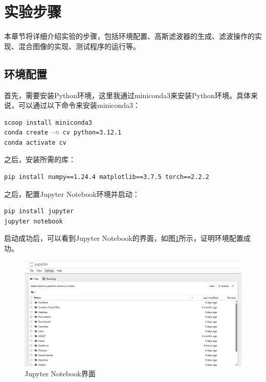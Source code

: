 \documentclass{article}
\begin{document}
\section{实验步骤}

本章节将详细介绍实验的步骤，包括环境配置、高斯滤波器的生成、滤波操作的实现、混合图像的实现、测试程序的运行等。

\subsection{环境配置}

首先，需要安装Python环境，这里我通过miniconda3来安装Python环境。具体来说，可以通过以下命令来安装miniconda3：

\begin{lstlisting}[language=bash]
scoop install miniconda3
conda create -n cv python=3.12.1
conda activate cv
\end{lstlisting}

之后，安装所需的库：

\begin{lstlisting}[language=bash]
pip install numpy==1.24.4 matplotlib==3.7.5 torch==2.2.2
\end{lstlisting}

之后，配置Jupyter Notebook环境并启动：

\begin{lstlisting}
pip install jupyter
jupyter notebook
\end{lstlisting}

启动成功后，可以看到Jupyter Notebook的界面，如图\ref{fig:jupyter}所示，证明环境配置成功。

\begin{figure}[H]
    \centering
    \includegraphics[width=\textwidth]{images/jupyter.png}
    \caption{Jupyter Notebook界面}
    \label{fig:jupyter}
\end{figure}
\end{document}
